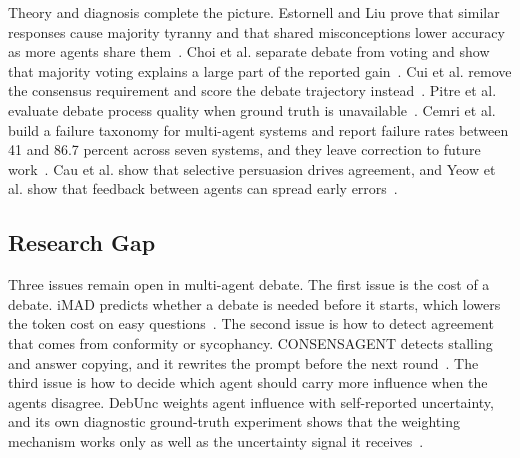 \documentclass[a4paper,fleqn]{cas-sc}
\begin{document}
Theory and diagnosis complete the picture. Estornell and Liu prove that similar responses cause majority tyranny and that shared misconceptions lower accuracy as more agents share them~\cite{estornell2024multillm}. Choi et al. separate debate from voting and show that majority voting explains a large part of the reported gain~\cite{choi2025debate}. Cui et al. remove the consensus requirement and score the debate trajectory instead~\cite{cui2026freemad}. Pitre et al. evaluate debate process quality when ground truth is unavailable~\cite{pitre2026diagnostic}. Cemri et al. build a failure taxonomy for multi-agent systems and report failure rates between 41 and 86.7 percent across seven systems, and they leave correction to future work~\cite{cemri2025why}. Cau et al. show that selective persuasion drives agreement, and Yeow et al. show that feedback between agents can spread early errors~\cite{cau2025selective,yeow2025reliable}.

\subsection{Research Gap}
Three issues remain open in multi-agent debate. The first issue is the cost of a debate. iMAD predicts whether a debate is needed before it starts, which lowers the token cost on easy questions~\cite{fan2026imad}. The second issue is how to detect agreement that comes from conformity or sycophancy. CONSENSAGENT detects stalling and answer copying, and it rewrites the prompt before the next round~\cite{pitre-etal-2025-consensagent}. The third issue is how to decide which agent should carry more influence when the agents disagree. DebUnc weights agent influence with self-reported uncertainty, and its own diagnostic ground-truth experiment shows that the weighting mechanism works only as well as the uncertainty signal it receives~\cite{yoffe-etal-2025-debunc}.
\end{document}
